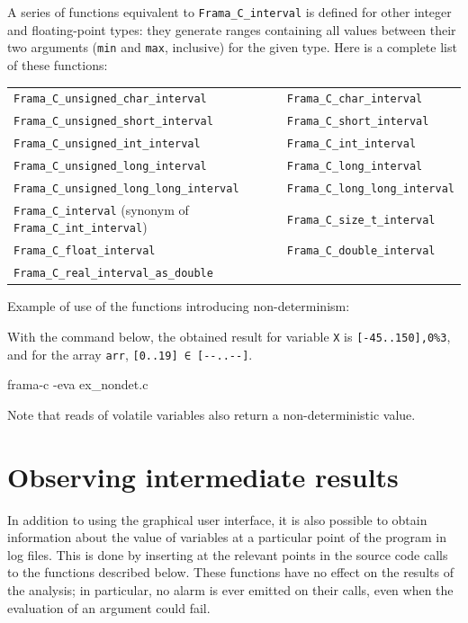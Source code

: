 \documentclass{frama-c-book}
\begin{document}
A series of functions equivalent to \lstinline|Frama_C_interval|
is defined for other integer and floating-point types:
they generate ranges containing all values between their two arguments
(\texttt{min} and \texttt{max}, inclusive) for the given type.
Here is a complete list of these functions:

\begin{table}[!ht]
  \centering
  \begin{tabular}{ll}
    \lstinline|Frama_C_unsigned_char_interval| &
    \lstinline|Frama_C_char_interval| \\
    \lstinline|Frama_C_unsigned_short_interval| &
    \lstinline|Frama_C_short_interval| \\
    \lstinline|Frama_C_unsigned_int_interval| &
    \lstinline|Frama_C_int_interval| \\
    \lstinline|Frama_C_unsigned_long_interval| &
    \lstinline|Frama_C_long_interval| \\
    \lstinline|Frama_C_unsigned_long_long_interval| &
    \lstinline|Frama_C_long_long_interval| \\
    \lstinline|Frama_C_interval| (synonym of \lstinline|Frama_C_int_interval|) &
    \lstinline|Frama_C_size_t_interval| \\
    \lstinline|Frama_C_float_interval| &
    \lstinline|Frama_C_double_interval| \\
    \lstinline|Frama_C_real_interval_as_double|
  \end{tabular}
\end{table}

Example of use of the functions introducing non-determinism:

With the command below, the obtained result for
variable \lstinline|X| is \lstinline|[-45..150],0%3|, and for the
array \lstinline|arr|, \lstinline|[0..19] ∈ [--..--]|.
\begin{frama-c-commands}
frama-c -eva ex_nondet.c
\end{frama-c-commands}

Note that reads of volatile variables also return a non-deterministic
value.

\section{Observing intermediate results}
\label{buitins_observation}

In addition to using the graphical user interface, it is also possible
to obtain information about the value of variables at a particular
point of the program in log files. This is done by inserting at the
relevant points in the source code calls to the functions described below.
These functions have no effect on the results of the analysis; in particular,
no alarm is ever emitted on their calls, even when the evaluation of an
argument could fail.
\end{document}
